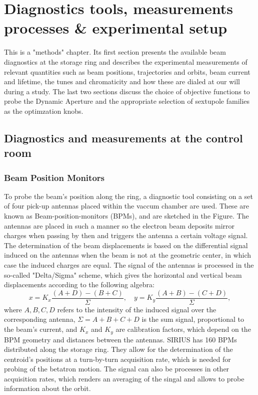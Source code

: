 \chapter{Diagnostics tools, measurements processes \& experimental setup}
This is a "methods" chapter. Its first section presents the available beam diagnostics at the storage ring and describes the experimental measurements of relevant quantities such as beam positions, trajectories and orbits, beam current and lifetime, the tunes and chromaticity and how these are dialed at our will during a study. The last two sections discuss the choice of objective functions to probe the Dynamic Aperture and the appropriate selection of sextupole families as the optimzation knobs.
\section{Diagnostics and measurements at the control room}
\subsection{Beam Position Monitors}
To probe the beam's position along the ring, a diagnostic tool consisting on a set of four pick-up antennas placed within the vaccum chamber are used. These are known as Beam-position-monitors (BPMs), and are sketched in the Figure. The antennas are placed in such a manner so the electron beam deposits mirror charges when passing by then and triggers the antenna a certain voltage signal. The determination of the beam displacements is based on the differential signal induced on the antennas when the beam is not at the geometric center, in which case the induced charges are equal. The signal of the antennas is processed in the so-called "Delta/Sigma" scheme, which gives the horizontal and vertical beam displacements according to the following algebra:
\begin{equation}
    x = K_x \frac{(A+D)-(B+C)}{\Sigma}, \quad y = K_y \frac{(A+B)-(C+D)}{\Sigma},
\end{equation}
where $A,B, C,D$ refers to the intensity of the induced signal over the corresponding antenna, $\Sigma=A+B+C+D$ is the sum signal, proportional to the beam's current, and $K_x$ and $K_y$ are calibration factors, which depend  on the BPM geometry  and distances between the antennas. SIRIUS has 160 BPMs distributed along the storage ring. They allow for the determination of the centroid's positions at a turn-by-turn acquisition rate, which is needed for probing of the betatron motion. The signal can also be processes in other acquisition rates, which renders an averaging of the singal and allows to probe information about the orbit.
